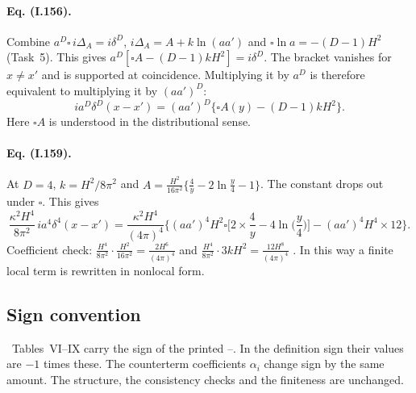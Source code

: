 \paragraph{Eq. (I.156).} Combine $a^D\square\,i\Delta_A=i\delta^D$, $i\Delta_A=A+k\ln(aa')$ and $\square\ln a=-(D-1)H^2$ (Task~5). This gives $a^D[\square A-(D-1)kH^2]=i\delta^D$.
The bracket vanishes for $x\neq x'$ and is supported at coincidence. Multiplying it by $a^D$ is therefore equivalent to multiplying it by $(aa')^D$:
\begin{equation}
ia^D\delta^D(x-x')=(aa')^D\big\{\square A(y)-(D-1)kH^2\big\}.
\tag{I.156}
\end{equation}
Here $\square A$ is understood in the distributional sense.

\paragraph{Eq. (I.159).} At $D=4$, $k=H^2/8\pi^2$ and $A=\frac{H^2}{16\pi^2}\big\{\frac4y-2\ln\frac y4-1\big\}$. The constant drops out under $\square$. This gives
\begin{equation}
\frac{\kappa^2H^4}{8\pi^2}\,ia^4\delta^4(x-x')=\frac{\kappa^2H^4}{(4\pi)^4}\Big\{(aa')^4H^2\square\Big[2\times\frac4y-4\ln\Big(\frac y4\Big)\Big]-(aa')^4H^4\times12\Big\}.
\tag{I.159}
\end{equation}
Coefficient check: $\frac{H^4}{8\pi^2}\cdot\frac{H^2}{16\pi^2}=\frac{2H^6}{(4\pi)^4}$ and $\frac{H^4}{8\pi^2}\cdot3kH^2=\frac{12H^8}{(4\pi)^4}$ \chEok.
In this way a finite local term is rewritten in nonlocal form.

\subsection{Sign convention}
\tA\ Tables~VI--IX carry the sign of the printed --. In the definition sign their values are $-1$ times these.
The counterterm coefficients $\alpha_i$ change sign by the same amount. The structure, the consistency checks and the finiteness are unchanged.

